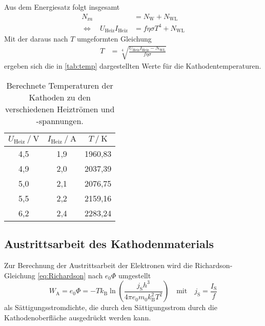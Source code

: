 Aus dem Energiesatz folgt insgesamt
\begin{align*}
N_{\text{zu}} &=N_{\text{W}}+N_{\text{WL}} \\
\Leftrightarrow \quad U_{\text{Heiz}} I_{\text{Heiz}} &=f \eta \sigma T^{4}+N_{\text{WL}}
\end{align*}
Mit der daraus nach $T$ umgeformten Gleichung
\begin{align*}
  T &= \sqrt[4]{ \frac {U_\text{Heiz} I_\text{Heiz} - N_\mathrm{WL}} {f \eta \sigma} } 
\end{align*}
ergeben sich die in \autoref{tab:temp} dargestellten Werte für die Kathodentemperaturen.
\begin{table}
  \centering
  \caption{Berechnete Temperaturen der Kathoden zu den verschiedenen Heiztrömen und -spannungen.}
  \label{tab:temp}
  \begin{tabular}{c c c}
    \toprule
    $U_\text{Heiz} \mathbin{/} \unit{\volt}$ &
    $I_\text{Heiz} \mathbin{/} \unit{\ampere}$ &
    $T \mathbin{/} \unit{\kelvin}$ \\
    \midrule
    4,5 &  1,9 & 1960,83 \\
    4,9 &  2,0 & 2037,39 \\
    5,0 &  2,1 & 2076,75 \\
    5,5 &  2,2 & 2159,16 \\
    6,2 &  2,4 & 2283,24 \\
    \bottomrule
  \end{tabular}
\end{table}


\subsection{Austrittsarbeit des Kathodenmaterials}

Zur Berechnung der Austrittsarbeit der Elektronen wird die Richardson-Gleichung \ref{eq:Richardson} nach
$e_{0} \Phi$ umgestellt
\begin{equation*}
  W_{\text{A}} = e_{0} \Phi = -T k_{\text{B}} \ln \left(\frac{j_{\text{S}} h^{3}}{4 \pi e_{0} m_{0} k_{\text{B}}^{2} T^{2}}\right)
  \quad \text{mit} \quad
  j_\text{S} = \frac{I_\text{S}}{f}
\end{equation*}
als Sättigungsstromdichte, die durch den Sättigungsstrom durch die Kathodenoberfläche ausgedrückt werden kann.

